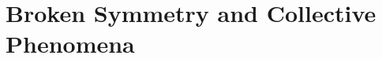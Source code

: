 \documentclass[../classnotes.tex]{subfiles}
\begin{document}
\chapter{Broken Symmetry and Collective Phenomena}
\end{document}
